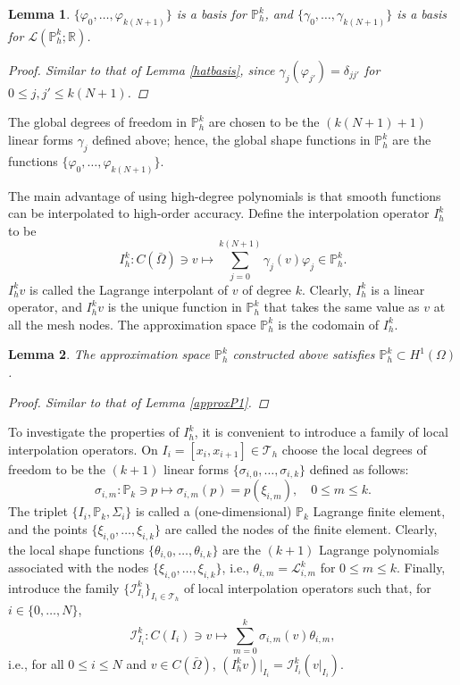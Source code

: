 \documentclass{article}
\newtheorem{lemma}{Lemma}
\begin{document}
\begin{lemma}
    $\{\varphi_0, \dots, \varphi_{k(N+1)}\}$ is a basis for $\mathbb{P}_h^k$, and $\{\gamma_0, \dots, \gamma_{k(N+1)}\}$ is a basis for $\mathcal{L}(\mathbb{P}_h^k; \mathbb{R})$.

\begin{proof}
    Similar to that of Lemma \ref{hatbasis}, since $\gamma_j(\varphi_{j'}) = \delta_{jj'}$ for $0 \le j,j' \le k(N+1)$.
\end{proof}
\end{lemma}
The global degrees of freedom in $\mathbb{P}_h^k$ are chosen to be the $(k(N+1)+1)$ linear forms $\gamma_j$ defined above; hence, the global shape functions in $\mathbb{P}_h^k$ are the functions $\{\varphi_0, \dots, \varphi_{k(N+1)}\}$.

The main advantage of using high-degree polynomials is that smooth functions can be interpolated to high-order accuracy. Define the interpolation operator $I_h^k$ to be
$$ I_h^k: C(\bar{\Omega}) \ni v \mapsto \sum_{j=0}^{k(N+1)} \gamma_j(v) \varphi_j \in \mathbb{P}_h^k. $$
$I_h^k v$ is called the Lagrange interpolant of $v$ of degree $k$. Clearly, $I_h^k$ is a linear operator, and $I_h^k v$ is the unique function in $\mathbb{P}_h^k$ that takes the same value as $v$ at all the mesh nodes. The approximation space $\mathbb{P}_h^k$ is the codomain of $I_h^k$. 

\begin{lemma}
    The approximation space $\mathbb{P}_h^k$ constructed above satisfies $\mathbb{P}_h^k \subset H^1(\Omega)$.
\begin{proof}
    Similar to that of Lemma \ref{approxP1}.
\end{proof}
\end{lemma}
To investigate the properties of $I_h^k$, it is convenient to introduce a family of local interpolation operators. On $I_i = [x_i, x_{i+1}] \in \mathcal{T}_h$ choose the local degrees of freedom to be the $(k+1)$ linear forms $\{\sigma_{i,0}, \dots, \sigma_{i,k}\}$ defined as follows:
$$ \sigma_{i,m}: \mathbb{P}_k \ni p \mapsto \sigma_{i,m}(p) = p(\xi_{i,m}), \quad 0 \le m \le k. $$
The triplet $\{I_i, \mathbb{P}_k, \Sigma_i\}$ is called a (one-dimensional) $\mathbb{P}_k$ Lagrange finite element, and the points $\{\xi_{i,0}, \dots, \xi_{i,k}\}$ are called the nodes of the finite element. Clearly, the local shape functions $\{\theta_{i,0}, \dots, \theta_{i,k}\}$ are the $(k+1)$ Lagrange polynomials associated with the nodes $\{\xi_{i,0}, \dots, \xi_{i,k}\}$, i.e., $\theta_{i,m} = \mathcal{L}_{i,m}^k$ for $0 \le m \le k$. Finally, introduce the family $\{\mathcal{I}_{I_i}^k\}_{I_i \in \mathcal{T}_h}$ of local interpolation operators such that, for $i \in \{0, \dots, N\}$,
$$ \mathcal{I}_{I_i}^k: C(I_i) \ni v \mapsto \sum_{m=0}^k \sigma_{i,m}(v) \theta_{i,m}, $$
i.e., for all $0 \le i \le N$ and $v \in C(\bar{\Omega})$, $(I_h^k v)|_{I_i} = \mathcal{I}_{I_i}^k(v|_{I_i})$.
\end{document}

